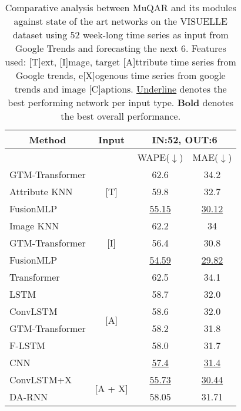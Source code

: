 \documentclass{article}
\begin{document}
\begin{table*}
\centering
  \caption{Comparative analysis between MuQAR and its modules against state of the art networks on the VISUELLE dataset using 52 week-long time series as input from Google Trends and forecasting the next 6. Features used: [T]ext, [I]mage, target [A]ttribute time series from Google trends, e[X]ogenous time series from google trends and image [C]aptions.
  \underline{Underline} denotes the best performing network per input type. \textbf{Bold} denotes the best overall performance.
  }
  \label{tab:results_visuelle}
  \begin{tabular}{l|c|cc}
    \toprule
     \multicolumn{1}{c}{\textbf{Method}} & 
     \multicolumn{1}{c}{\textbf{Input}} & 
     \multicolumn{2}{c}{\textbf{IN:52, OUT:6}}
     \\
     
     \midrule
     & & WAPE($\downarrow$) & MAE($\downarrow$) \\
     
    \midrule
    GTM-Transformer \cite{skenderi2021well} & \multirow{3}{*}{[T]} & 62.6 & 34.2 \\    
    Attribute KNN \cite{ekambaram2020attention} &  & 59.8 & 32.7 \\
    FusionMLP &  & \underline{55.15} & \underline{30.12} \\
    \midrule
    
    Image KNN \cite{ekambaram2020attention} & \multirow{3}{*}{[I]} & 62.2 & 34 \\
    GTM-Transformer \cite{skenderi2021well} &  & 56.4 & 30.8 \\
    FusionMLP &  & \underline{54.59} & \underline{29.82} \\
    
    \midrule

    Transformer & \multirow{6}{*}{[A]} & 62.5 & 34.1 \\
    LSTM &  & 58.7 & 32.0 \\
    ConvLSTM &  & 58.6 & 32.0 \\    
    
    GTM-Transformer \cite{skenderi2021well} &  & 58.2 & 31.8 \\
    
    F-LSTM & & 58.0 & 31.7 \\
    CNN &  & \underline{57.4} & \underline{31.4} \\
    
    \midrule
    
    ConvLSTM+X & \multirow{2}{*}{[A + X]} & \underline{55.73} & \underline{30.44} \\
    DA-RNN &  & 58.05 & 31.71 \\
        

\end{tabular}
\end{table*}
\end{document}
